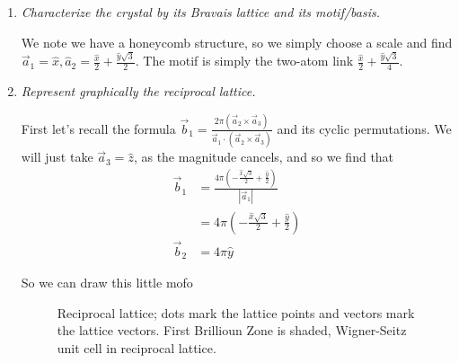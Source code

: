 \documentclass[10pt]{report}
\newcommand{\abs}[1]{\left|#1\right|}
\begin{document}
\begin{enumerate}[1.]
    \item \emph{Characterize the crystal by its Bravais lattice and its motif/basis.}

        We note we have a honeycomb structure, so we simply choose a scale and find $\vec{a}_1 = \hat{x}, \hat{a}_2 = \frac{\hat{x}}{2} + \frac{\hat{y}\sqrt{3}}{2}$. The motif is simply the two-atom link $\frac{\hat{x}}{2} + \frac{\hat{y}\sqrt{3}}{4}$. 

    \item \emph{Represent graphically the reciprocal lattice.}

        First let's recall the formula $\vec{b}_1 = \frac{2\pi\left( \vec{a}_2 \times \vec{a}_3 \right)}{\vec{a}_1 \cdot \left( \vec{a}_2 \times \vec{a}_3 \right)}$ and its cyclic permutations. We will just take $\vec{a}_3 = \hat{z}$, as the magnitude cancels, and so we find that
        \begin{align}
            \vec{b}_1 &= \frac{4\pi \left( -\frac{\hat{x}\sqrt{3}}{2} + \frac{\hat{y}}{2} \right)}{\abs{\vec{a}_1}}\\
            &= 4\pi \left( -\frac{\hat{x}\sqrt{3}}{2} + \frac{\hat{y}}{2} \right)\\
            \vec{b}_2 &= 4\pi\hat{y}
        \end{align}

        So we can draw this little mofo
        \begin{figure}[!h]
            \centering
            \caption{Reciprocal lattice; dots mark the lattice points and vectors mark the lattice vectors. First Brillioun Zone is shaded, Wigner-Seitz unit cell in reciprocal lattice.}
            \label{08.10.lattice}
        \end{figure}


\end{enumerate}
\end{document}
